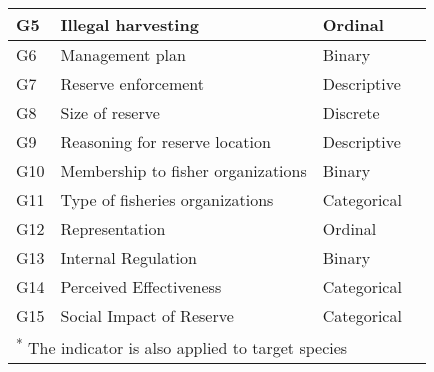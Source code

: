 \documentclass[12pt,]{article}
\begin{document}
\begin{table}
{\begin{tabular}[t]{l|l|l|l}
\hline
\hspace{1em}G5 & Illegal harvesting & Ordinal & \\
\hline
\hspace{1em}G6 & Management plan & Binary & \\
\hline
\hspace{1em}G7 & Reserve enforcement & Descriptive & \\
\hline
\hspace{1em}G8 & Size of reserve & Discrete & \\
\hline
\hspace{1em}G9 & Reasoning for reserve location & Descriptive & \\
\hline
\hspace{1em}G10 & Membership to fisher organizations & Binary & \\
\hline
\hspace{1em}G11 & Type of fisheries organizations & Categorical & \\
\hline
\hspace{1em}G12 & Representation & Ordinal & \\
\hline
\hspace{1em}G13 & Internal Regulation & Binary & \\
\hline
\hspace{1em}G14 & Perceived Effectiveness & Categorical & \\
\hline
\hspace{1em}G15 & Social Impact of Reserve & Categorical & \\
\hline
\multicolumn{4}{l}{\textsuperscript{*} The indicator is also applied to target species}\\
\end{tabular}}
\end{table}

\clearpage
\end{document}
